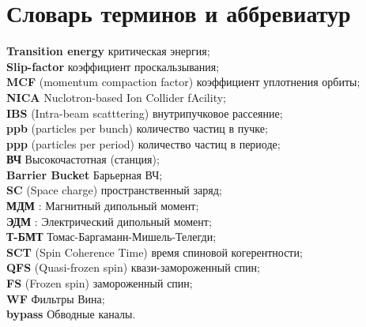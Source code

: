 \chapter*{Словарь терминов и аббревиатур}             %

\textbf{Transition energy} критическая энергия;\\
\textbf{Slip-factor} коэффициент проскальзывания;\\
\textbf{MCF} (momentum compaction factor) коэффициент уплотнения орбиты;\\
\textbf{NICA} Nuclotron-based Ion Collider fAcility;\\
\textbf{IBS} (Intra-beam scatttering) внутрипучковое рассеяние;\\
\textbf{ppb} (particles per bunch) количество частиц в пучке;\\
\textbf{ppp} (particles per period) количество частиц в периоде;\\
\textbf{ВЧ} Высокочастотная (станция);\\
\textbf{Barrier Bucket} Барьерная ВЧ;\\
\textbf{SC} (Space charge) пространственный заряд;\\
\textbf{МДМ} : Магнитный дипольный момент;\\
\textbf{ЭДМ} : Электрический дипольный момент;\\
\textbf{Т-БМТ} Томас-Баргаманн-Мишель-Телегди;\\
\textbf{SCT} (Spin Coherence Time) время спиновой когерентности;\\
\textbf{QFS} (Quasi-frozen spin) квази-замороженный спин;\\
\textbf{FS} (Frozen spin) замороженный спин;\\
\textbf{WF} Фильтры Вина;\\
\textbf{bypass} Обводные каналы.\\
